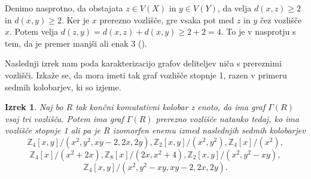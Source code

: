 \documentclass[a4paper, 12pt]{amsart}
\theoremstyle{definition} %
\theoremstyle{plain} %
\newtheorem{izrek}[definicija]{Izrek}
\newcommand{\Z}{\mathbb Z}
\begin{document}
\proof
Denimo nasprotno, da obstajata $z\in V(X)$ in $y\in V(Y)$, da velja $d(x,z)\ge2$ in $d(x,y)\ge 2$. Ker je $x$ prerezno vozlišče, gre vsaka pot med $z$ in $y$ čez vozlišče $x$. Potem velja $d(z,y)= d(x,z) + d(x,y) \ge 2 + 2 =4 $. To  je v nasprotju s tem, da je premer manjši ali enak 3 (\cite{diploma}).
\endproof

Naslednji izrek nam poda karakterizacijo grafov deliteljev niča s prereznimi vozlišči. Izkaže se, da mora imeti tak graf vozlišče stopnje 1, razen v primeru sedmih kolobarjev, ki so izjeme.

\begin{izrek}
\label{izrek-cutVertex}
Naj bo $R$ tak končni komutativni kolobar z enoto, da ima graf $\Gamma(R)$ vsaj tri vozlišča. Potem ima graf $\Gamma(R)$ prerezno vozlišče natanko tedaj, ko ima vozlišče stopnje 1 ali pa je $R$ izomorfen enemu izmed naslednjih sedmih kolobarjev
$$
\Z_4[x,y]/(x^2, y^2, xy-2,2x,2y), \Z_2[x,y]/(x^2,y^2), \Z_4[x]/(x^2),
$$
$$
\Z_4[x]/(x^2+2x), \Z_8[x]/(2x,x^2 + 4), \Z_2[x,y]/(x^2, y^2 - xy),
$$
$$
\Z_4[x,y]/(x^2, y^2 - xy, xy-2,2x,2y).
$$
\end{izrek}
\end{document}
